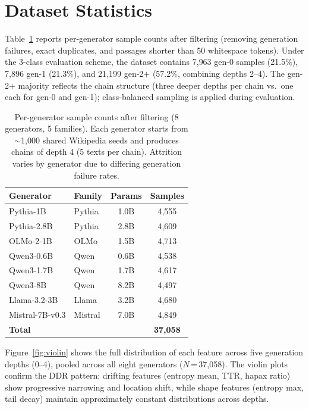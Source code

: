 \section{Dataset Statistics}
\label{app:dataset-stats}

Table~\ref{tab:dataset-stats} reports per-generator sample counts after filtering (removing generation failures, exact duplicates, and passages shorter than 50 whitespace tokens).
Under the 3-class evaluation scheme, the dataset contains 7{,}963 gen-0 samples (21.5\%), 7{,}896 gen-1 (21.3\%), and 21{,}199 gen-2+ (57.2\%, combining depths 2--4).
The gen-2+ majority reflects the chain structure (three deeper depths per chain vs.\ one each for gen-0 and gen-1); class-balanced sampling is applied during evaluation.

\begin{table}[t]
\centering
\small
\caption[Per-generator sample counts]{Per-generator sample counts after filtering (8 generators, 5 families). Each generator starts from ${\sim}$1{,}000 shared Wikipedia seeds and produces chains of depth 4 (5 texts per chain). Attrition varies by generator due to differing generation failure rates.\protect\footnotemark}
\label{tab:dataset-stats}
\begin{tabular}{llcc}
\toprule
\textbf{Generator} & \textbf{Family} & \textbf{Params} & \textbf{Samples} \\
\midrule
Pythia-1B       & Pythia  & 1.0B & 4{,}555 \\
Pythia-2.8B     & Pythia  & 2.8B & 4{,}609 \\
OLMo-2-1B      & OLMo    & 1.5B & 4{,}713 \\
Qwen3-0.6B     & Qwen    & 0.6B & 4{,}538 \\
Qwen3-1.7B     & Qwen    & 1.7B & 4{,}617 \\
Qwen3-8B       & Qwen    & 8.2B & 4{,}497 \\
Llama-3.2-3B   & Llama   & 3.2B & 4{,}680 \\
Mistral-7B-v0.3 & Mistral & 7.0B & 4{,}849 \\
\midrule
\multicolumn{3}{l}{\textbf{Total}} & \textbf{37{,}058} \\
\bottomrule
\end{tabular}
\end{table}

Figure~\ref{fig:violin} shows the full distribution of each feature across five generation depths (0--4), pooled across all eight generators ($N$\,=\,37{,}058).
The violin plots confirm the DDR pattern: drifting features (entropy mean, TTR, hapax ratio) show progressive narrowing and location shift, while shape features (entropy max, tail decay) maintain approximately constant distributions across depths.

